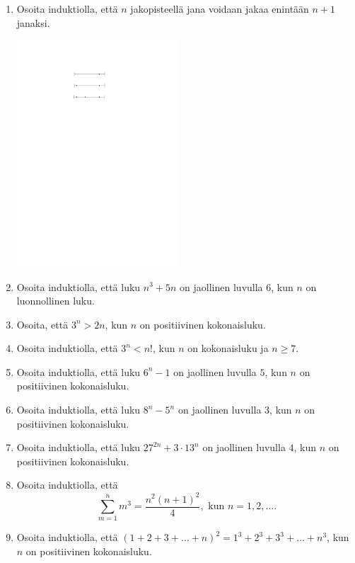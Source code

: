 \begin{enumerate}

\item Osoita induktiolla, että $n$ jakopisteellä jana voidaan jakaa enintään $n + 1$ janaksi.

\begin{center}
\includegraphics[width=6cm]{kuvat/Kappale5_4_janat_v2}
\end{center}

\item Osoita induktiolla, että luku $n^3 + 5n$ on jaollinen luvulla $6$, kun $n$ on luonnollinen luku.

\item Osoita, että $3^n > 2n$, kun $n$ on positiivinen kokonaisluku.

\item Osoita induktiolla, että $3^n < n!$, kun $n$ on kokonaisluku ja $n\ge 7$.

\item Osoita induktiolla, että luku $6^n - 1$ on jaollinen luvulla $5$, kun $n$ on positiivinen kokonaisluku.

\item Osoita induktiolla, että luku $8^n - 5^n$ on jaollinen luvulla $3$, kun $n$ on positiivinen kokonaisluku.

\item Osoita induktiolla, että luku $27^{2n} + 3 \cdot 13^{n}$ on jaollinen luvulla $4$, kun $n$ on positiivinen kokonaisluku.

\item 
Osoita induktiolla, että
\[
\sum_{m=1}^n m^3= \frac{n^2(n+1)^2}{4}, \textrm{ kun } n=1,2,\ldots.
\]

\item Osoita induktiolla, että $(1 + 2 + 3 +\ldots + n)^2 = 1^3 + 2^3 + 3^3 + \ldots + n^3$, kun $n$ on positiivinen kokonaisluku.


\end{enumerate}
